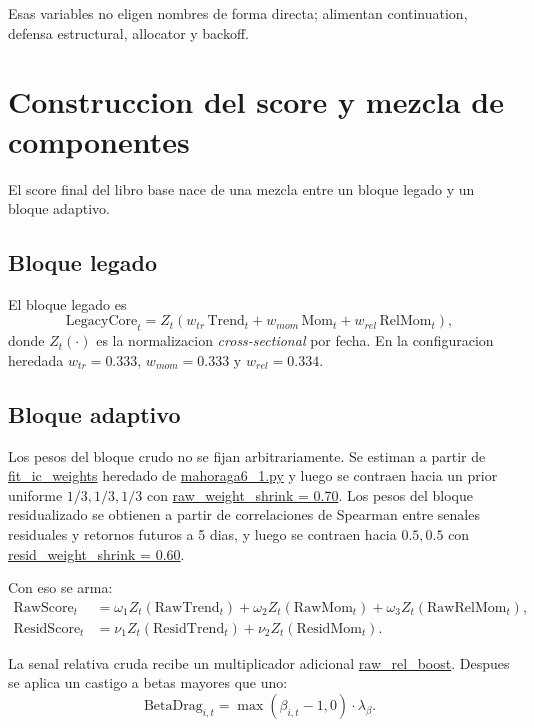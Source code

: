 \documentclass[11pt,letterpaper]{article}
\newcommand{\code}[1]{{\urlstyle{tt}\url{#1}}}
\begin{document}
Esas variables no eligen nombres de forma directa; alimentan continuation, defensa estructural, allocator y backoff.

\section{Construccion del score y mezcla de componentes}
El score final del libro base nace de una mezcla entre un bloque legado y un bloque adaptivo.

\subsection{Bloque legado}
El bloque legado es
\begin{equation}
\mathrm{LegacyCore}_t
= Z_t\!\left(
w_{tr}\,\mathrm{Trend}_t
 + w_{mom}\,\mathrm{Mom}_t
 + w_{rel}\,\mathrm{RelMom}_t
\right),
\end{equation}
donde \(Z_t(\cdot)\) es la normalizacion \emph{cross-sectional} por fecha. En la configuracion heredada \(w_{tr}=0.333\), \(w_{mom}=0.333\) y \(w_{rel}=0.334\).

\subsection{Bloque adaptivo}
Los pesos del bloque crudo no se fijan arbitrariamente. Se estiman a partir de \code{fit_ic_weights} heredado de \code{mahoraga6_1.py} y luego se contraen hacia un prior uniforme \(1/3,1/3,1/3\) con \code{raw_weight_shrink = 0.70}. Los pesos del bloque residualizado se obtienen a partir de correlaciones de Spearman entre senales residuales y retornos futuros a 5 dias, y luego se contraen hacia \(0.5,0.5\) con \code{resid_weight_shrink = 0.60}.

Con eso se arma:
\begin{align}
\mathrm{RawScore}_t &= \omega_1 Z_t(\mathrm{RawTrend}_t)
                   + \omega_2 Z_t(\mathrm{RawMom}_t)
                   + \omega_3 Z_t(\mathrm{RawRelMom}_t), \\
\mathrm{ResidScore}_t &= \nu_1 Z_t(\mathrm{ResidTrend}_t)
                     + \nu_2 Z_t(\mathrm{ResidMom}_t).
\end{align}

La senal relativa cruda recibe un multiplicador adicional \code{raw_rel_boost}. Despues se aplica un castigo a betas mayores que uno:
\begin{equation}
\mathrm{BetaDrag}_{i,t} = \max(\beta_{i,t} - 1, 0)\cdot \lambda_{\beta}.
\end{equation}
\end{document}
